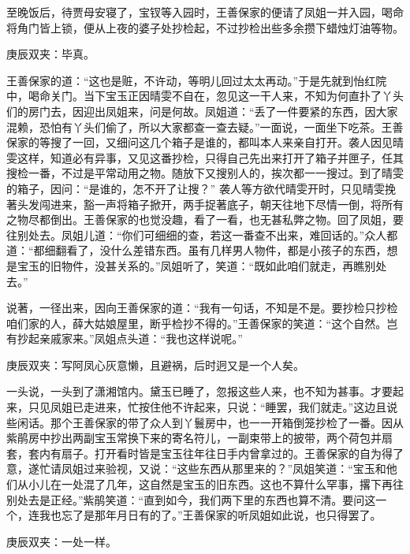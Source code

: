 \begin{parag}
    至晚饭后，待贾母安寝了，宝钗等入园时，王善保家的便请了凤姐一并入园，喝命将角门皆上锁，便从上夜的婆子处抄检起，不过抄检出些多余攒下蜡烛灯油等物。\begin{note}庚辰双夹：毕真。\end{note}王善保家的道：“这也是赃，不许动，等明儿回过太太再动。”于是先就到怡红院中，喝命关门。当下宝玉正因晴雯不自在，忽见这一干人来，不知为何直扑了丫头们的房门去，因迎出凤姐来，问是何故。凤姐道：“丢了一件要紧的东西，因大家混赖，恐怕有丫头们偷了，所以大家都查一查去疑。”一面说，一面坐下吃茶。王善保家的等搜了一回，又细问这几个箱子是谁的，都叫本人来亲自打开。袭人因见晴雯这样，知道必有异事，又见这番抄检，只得自己先出来打开了箱子并匣子，任其搜检一番，不过是平常动用之物。随放下又搜别人的，挨次都一一搜过。到了晴雯的箱子，因问：“是谁的，怎不开了让搜？” 袭人等方欲代晴雯开时，只见晴雯挽著头发闯进来，豁一声将箱子掀开，两手捉著底子，朝天往地下尽情一倒，将所有之物尽都倒出。王善保家的也觉没趣，看了一看，也无甚私弊之物。回了凤姐，要往别处去。凤姐儿道：“你们可细细的查，若这一番查不出来，难回话的。”众人都道：“都细翻看了，没什么差错东西。虽有几样男人物件，都是小孩子的东西，想是宝玉的旧物件，没甚关系的。”凤姐听了，笑道：“既如此咱们就走，再瞧别处去。”
\end{parag}


\begin{parag}
    说著，一径出来，因向王善保家的道：“我有一句话，不知是不是。要抄检只抄检咱们家的人，薛大姑娘屋里，断乎检抄不得的。”王善保家的笑道：“这个自然。岂有抄起亲戚家来。”凤姐点头道：“我也这样说呢。”\begin{note}庚辰双夹：写阿凤心灰意懒，且避祸，后时迥又是一个人矣。\end{note}一头说，一头到了潇湘馆内。黛玉已睡了，忽报这些人来，也不知为甚事。才要起来，只见凤姐已走进来，忙按住他不许起来，只说：“睡罢，我们就走。”这边且说些闲话。那个王善保家的带了众人到丫鬟房中，也一一开箱倒笼抄检了一番。因从紫鹃房中抄出两副宝玉常换下来的寄名符儿，一副束带上的披带，两个荷包并扇套，套内有扇子。打开看时皆是宝玉往年往日手内曾拿过的。王善保家的自为得了意，遂忙请凤姐过来验视，又说：“这些东西从那里来的？”凤姐笑道：“宝玉和他们从小儿在一处混了几年，这自然是宝玉的旧东西。这也不算什么罕事，撂下再往别处去是正经。”紫鹃笑道：“直到如今，我们两下里的东西也算不清。要问这一个，连我也忘了是那年月日有的了。”王善保家的听凤姐如此说，也只得罢了。\begin{note}庚辰双夹：一处一样。\end{note}
\end{parag}


